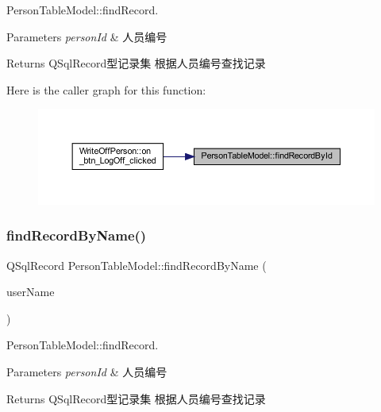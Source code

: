 Person\+Table\+Model\+::find\+Record. 


\begin{DoxyParams}{Parameters}
{\em person\+Id} & 人员编号 \\
\hline
\end{DoxyParams}
\begin{DoxyReturn}{Returns}
Q\+Sql\+Record型记录集 根据人员编号查找记录 
\end{DoxyReturn}
Here is the caller graph for this function\+:
\nopagebreak
\begin{figure}[H]
\begin{center}
\leavevmode
\includegraphics[width=350pt]{class_person_table_model_afd1547d0c85e360bad55b08aa0f4e338_icgraph}
\end{center}
\end{figure}
\mbox{\label{class_person_table_model_aead4c2d3f11bb6b137fefbb5a88ff777}} 
\subsubsection{\texorpdfstring{findRecordByName()}{findRecordByName()}}
{\footnotesize\ttfamily Q\+Sql\+Record Person\+Table\+Model\+::find\+Record\+By\+Name (\begin{DoxyParamCaption}\item[{const Q\+String}]{user\+Name }\end{DoxyParamCaption})}



Person\+Table\+Model\+::find\+Record. 


\begin{DoxyParams}{Parameters}
{\em person\+Id} & 人员编号 \\
\hline
\end{DoxyParams}
\begin{DoxyReturn}{Returns}
Q\+Sql\+Record型记录集 根据人员编号查找记录 
\end{DoxyReturn}
\mbox{\label{class_person_table_model_a4cac1b30aecba8739333cbcfb8d66515}} 
